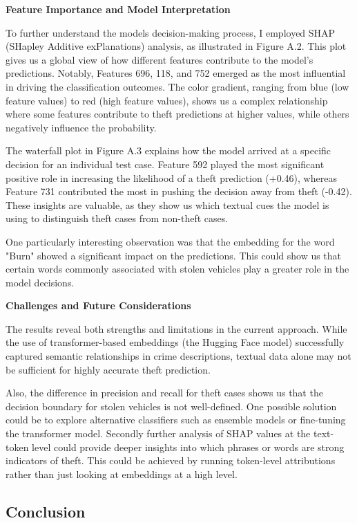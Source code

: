\documentclass[
]{article}
\begin{document}
\textbf{Feature Importance and Model Interpretation}

To further understand the model\textquotesingle s decision-making
process, I employed SHAP (SHapley Additive exPlanations) analysis, as
illustrated in Figure A.2. This plot gives us a global view of how
different features contribute to the model's predictions. Notably,
Features 696, 118, and 752 emerged as the most influential in driving
the classification outcomes. The color gradient, ranging from blue (low
feature values) to red (high feature values), shows us a complex
relationship where some features contribute to theft predictions at
higher values, while others negatively influence the probability.

The waterfall plot in Figure A.3 explains how the model arrived at a
specific decision for an individual test case. Feature 592 played the
most significant positive role in increasing the likelihood of a theft
prediction (+0.46), whereas Feature 731 contributed the most in pushing
the decision away from theft (-0.42). These insights are valuable, as
they show us which textual cues the model is using to distinguish theft
cases from non-theft cases.

One particularly interesting observation was that the embedding for the
word "Burn" showed a significant impact on the predictions. This could
show us that certain words commonly associated with stolen vehicles play
a greater role in the model decisions.

\textbf{Challenges and Future Considerations}

The results reveal both strengths and limitations in the current
approach. While the use of transformer-based embeddings (the Hugging
Face model) successfully captured semantic relationships in crime
descriptions, textual data alone may not be sufficient for highly
accurate theft prediction.

Also, the difference in precision and recall for theft cases shows us
that the decision boundary for stolen vehicles is not well-defined. One
possible solution could be to explore alternative classifiers such as
ensemble models or fine-tuning the transformer model. Secondly further
analysis of SHAP values at the text-token level could provide deeper
insights into which phrases or words are strong indicators of theft.
This could be achieved by running token-level attributions rather than
just looking at embeddings at a high level.

\subsection{Conclusion}\label{conclusion}
\end{document}

